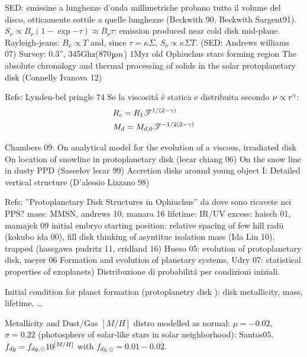 \begin{workout}
SED: emissine a lunghezze d'onda millimetriche probano tutto il volume del disco, otticamente sottile a quelle lunghezze (Beckwith 90, Beckwith Sargent91).
$S_{\nu}\propto B_{\nu}(1-\exp{-\tau})\approx B_{\nu}\tau$: emission produced near cold disk mid-plane.
Rayleigh-jeans: $B_{\nu}\propto T$ and, since $\tau=\kappa\Sigma$, $S_{\nu}\propto \kappa\Sigma T$.
(SED: Andrews williams 07)
Survey: 0.3'', 345Ghz(870$\micro m$) 1Myr old Ophiuchus stars forming region
The absolute chronology and thermal processing of solids in the solar protoplanetary disk (Connelly Ivanova 12)
\end{workout}

\begin{workout}
Refs: Lynden-bel pringle 74
Se la viscosit\'a \'e statica e distribuita secondo $\nu\propto r^{\gamma}$:
\begin{align}
&R_c=R_1\mathcal{T}^{1/(2-\gamma)}\\
&M_d=M_{d,0}\mathcal{T}^{-1/2(2-\gamma)}\\
\end{align}
\end{workout}

\begin{workout}
Chambers 09: On analytical model for the evolution of a viscous, irradiated disk
On location of snowline in protoplanetary disk (lecar chiang 06)
On the snow line in dusty PPD (Sasselov lecar 99)
Accretion disks around young object I: Detailed vertical structure (D'alessio Lizzano 98)
\end{workout}

\begin{workout}
Refs: ''Protoplanetary Disk Structures in Ophiuchus''
da dove sono ricavete nei PPS?
mass: MMSN, andrews 10, manara 16
lifetime: IR/UV excess: haisch 01, mamajek 09
initial embryo starting position: relative spacing of few hill radii (kokubo ida 00), fill disk thinking of asyntituc isolation mass (Ida Lin 10), trapped (hasegawa pudritz 11, cridland 16)
Hueso 05: evolution of protoplanetary disk, meyer 06 Formation and evolution of planetary systems, Udry 07: statistical properties of exoplanets)
Distribuzione di probabilit\'a per condizioni iniziali.

Initial condition for planet formation (protoplanetry disk \cite{meyer2006formation}): disk metallicity, mass, lifetime, \ldots

{Metallicity and Dust/Gas}
$[M/H]$ distro modelled as normal: $\mu=-0.02$, $\sigma=0.22$ (photosphere of solar-like stars in solar neighborhood): Santos05.
$f_{dg}=f_{dg,\odot}10^{[M/H]}$ with $f_{dg,\odot}=0.01-0.02$.
\end{workout}

